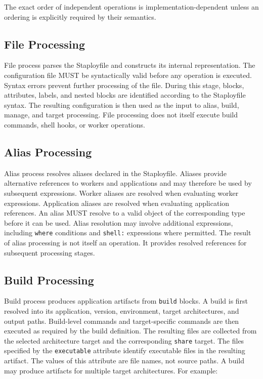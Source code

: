 \documentclass[11pt,a4paper]{article}
\begin{document}
    The exact order of independent operations is implementation-dependent unless an ordering is explicitly required by their semantics.

    \subsection{File Processing}\label{subsec:file-processing}

    File process parses the Staployfile and constructs its internal representation.
    The configuration file MUST be syntactically valid before any operation is executed.
    Syntax errors prevent further processing of the file.
    During this stage, blocks, attributes, labels, and nested blocks are identified according to the Staployfile syntax.
    The resulting configuration is then used as the input to alias, build, manage, and target processing.
    File processing does not itself execute build commands, shell hooks, or worker operations.

    \subsection{Alias Processing}\label{subsec:alias-processing}

    Alias process resolves aliases declared in the Staployfile.
    Aliases provide alternative references to workers and applications and may therefore be used by subsequent expressions.
    Worker aliases are resolved when evaluating worker expressions.
    Application aliases are resolved when evaluating application references.
    An alias MUST resolve to a valid object of the corresponding type before it can be used.
    Alias resolution may involve additional expressions, including \texttt{where} conditions and \texttt{shell:} expressions where permitted.
    The result of alias processing is not itself an operation.
    It provides resolved references for subsequent processing stages.

    \subsection{Build Processing}\label{subsec:build-processing}

    Build process produces application artifacts from \texttt{build} blocks.
    A build is first resolved into its application, version, environment, target architectures, and output paths.
    Build-level commands and target-specific commands are then executed as required by the build definition.
    The resulting files are collected from the selected architecture target and the corresponding \texttt{share} target.
    The files specified by the \texttt{executable} attribute identify executable files in the resulting artifact.
    The values of this attribute are file names, not source paths.
    A build may produce artifacts for multiple target architectures.
    For example:
\end{document}
